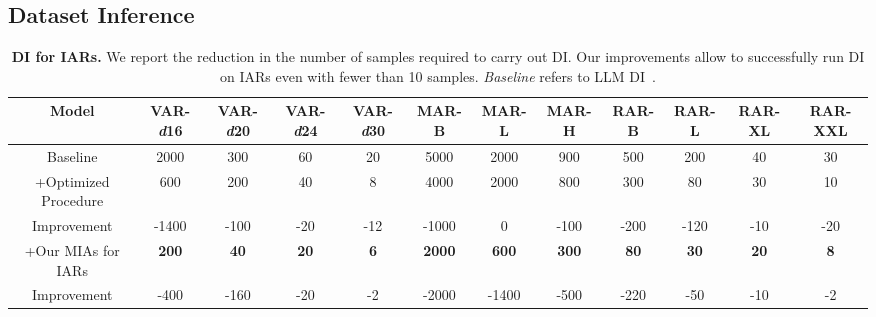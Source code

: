 \subsection{Dataset Inference}
\label{sec:di}


\begin{table*}[h]
    \centering
    \newcommand{\tightcolsep}{\setlength{\tabcolsep}{2pt}} %
    \tightcolsep %
    \scriptsize
    \caption{\textbf{DI for IARs.} We report the reduction in the number of samples required to carry out DI. Our improvements allow to successfully run DI on IARs even with fewer than 10 samples. \textit{Baseline} refers to LLM DI~\citep{maini2024llmdatasetinferencedid}.
    }
   \begin{tabular}{cccccccccccc}
        \toprule
        \textbf{Model} & \textbf{VAR-\textit{d}16} & \textbf{VAR-\textit{d}20} & \textbf{VAR-\textit{d}24} & \textbf{VAR-\textit{d}30} & \textbf{MAR-B} & \textbf{MAR-L} & \textbf{MAR-H} & \textbf{RAR-B} & \textbf{RAR-L} & \textbf{RAR-XL} & \textbf{RAR-XXL} \\
        \midrule
        Baseline & 2000 & 300 & 60 & 20 & 5000 & 2000  & 900 & 500 & 200 & 40 & 30 \\
        \midrule
        +Optimized Procedure & 600 & 200 & 40 & 8 & 4000 & 2000 & 800 & 300 & 80 & 30 & 10 \\
       Improvement & -1400 & -100 & -20 & -12 & -1000 & 0 & -100 & -200 & -120 & -10 & -20 \\
        \midrule
        +Our MIAs for IARs & \textbf{200} & \textbf{40} & \textbf{20} & \textbf{6} & \textbf{2000} & \textbf{600} & \textbf{300} & \textbf{80} & \textbf{30} & \textbf{20} & \textbf{8} \\
                Improvement & -400 & -160 & -20 & -2 & -2000 & -1400 & -500 &-220 & -50 & -10 & -2 \\
        \bottomrule
    \end{tabular}
    \label{tab:di_naive_vs_ours}
\end{table*}








